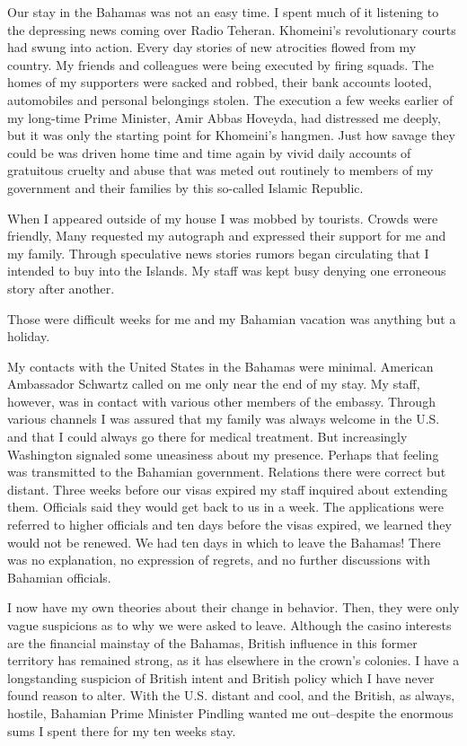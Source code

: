 Our stay in the Bahamas was not an easy time. I spent much of it listening to the depressing news coming over Radio Teheran. Khomeini's revolutionary courts had swung into action. Every day stories of new atrocities flowed from my country. My friends and colleagues were being executed by firing squads. The homes of my supporters were sacked and robbed, their bank accounts looted, automobiles and personal belongings stolen. The execution a few weeks earlier of my long-time Prime Minister, Amir Abbas Hoveyda, had distressed me deeply, but it was only the starting point for Khomeini’s hangmen. Just how savage they could be was driven home time and time again by vivid daily accounts of gratuitous cruelty and abuse that was meted out routinely to members of my government and their families by this so-called Islamic Republic. 

When I appeared outside of my house I was mobbed by tourists. Crowds were friendly, Many requested my autograph and expressed their support for me and my family. Through speculative news stories rumors began circulating that I intended to buy into the Islands. My staff was kept busy denying one erroneous story after another. 

Those were difficult weeks for me and my Bahamian vacation was anything but a holiday. 

My contacts with the United States in the Bahamas were minimal. American Ambassador Schwartz called on me only near the end of my stay. My staff, however, was in contact with various other members of the embassy. Through various channels I was assured that my family was always welcome in the U.S. and that I could always go there for medical treatment. But increasingly Washington signaled some uneasiness about my presence. Perhaps that feeling was transmitted to the Bahamian government. Relations there were correct but distant. Three weeks before our visas expired my staff inquired about extending them. Officials said they would get back to us in a week. The applications were referred to higher officials and ten days before the visas expired, we learned they would not be renewed. We had ten days in which to leave the Bahamas! There was no explanation, no expression of regrets, and no further discussions with Bahamian officials. 

I now have my own theories about their change in behavior. Then, they were only vague suspicions as to why we were asked to leave. Although the casino interests are the financial mainstay of the Bahamas, British influence in this former territory has remained strong, as it has elsewhere in the crown's colonies. I have a longstanding suspicion of British intent and British policy which I have never found reason to alter. With the U.S. distant and cool, and the British, as always, hostile, Bahamian Prime Minister Pindling wanted me out--despite the enormous sums I spent there for my ten weeks stay. 

